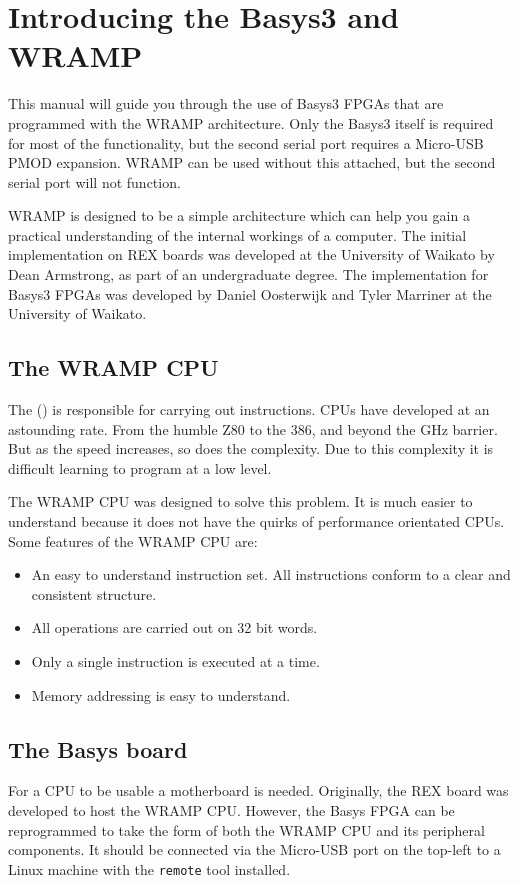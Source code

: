 \section{Introducing the Basys3 and WRAMP}

This manual will guide you through the use of Basys3 FPGAs that are programmed
with the WRAMP architecture. Only the Basys3 itself is required for most of the
functionality, but the second serial port requires a Micro-USB PMOD expansion.
WRAMP can be used without this attached, but the second serial port will not function.

WRAMP is designed to be a simple architecture which can help you gain a practical
understanding of the internal workings of a computer. The initial implementation
on REX boards was developed at the University of Waikato by Dean Armstrong, as
part of an undergraduate degree. The implementation for Basys3 FPGAs was developed
by Daniel Oosterwijk and Tyler Marriner at the University of Waikato.

\subsection{The WRAMP CPU}
The  () is responsible for carrying out 
instructions.
CPUs have developed at an astounding rate. From the humble Z80 to the 386, and
beyond the GHz barrier. But as the speed increases, so does
the complexity. Due to this complexity it is difficult learning to program
at a low level. 

The WRAMP CPU was designed to solve this problem. It is much easier to 
understand because it does not have the quirks of performance orientated CPUs.
Some features of the WRAMP CPU are:
\begin{itemize}
    \item An easy to understand instruction set. All instructions conform
            to a clear and consistent structure.
    \item All operations are carried out on 32 bit words.
    \item Only a single instruction is executed at a time.
    \item Memory addressing is easy to understand.
\end{itemize}

\subsection{The Basys board}
For a CPU to be usable a motherboard is needed. Originally, the REX board was
developed to host the WRAMP CPU. However, the Basys FPGA can be reprogrammed
to take the form of both the WRAMP CPU and its peripheral components.
It should be connected via the Micro-USB port on the top-left to a Linux machine
with the \texttt{remote} tool installed.


